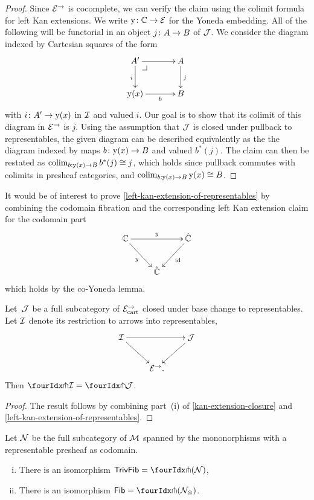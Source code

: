 \documentclass[reqno,10pt,a4paper,oneside,draft]{amsart}
\begin{document}
\begin{proof}
Since $\catE^\to$ is cocomplete, we can verify the claim using the colimit formula for left Kan extensions.
We write $\yon \co \cat{C} \to \catE$ for the Yoneda embedding.
All of the following will be functorial in an object $j \co A \to B$ of $\cal{J}$.
We consider the diagram indexed by Cartesian squares of the form
\[
\xymatrix@C=1.2cm{
  A'
  \ar[r]
  \ar[d]_{i}
  \pullback{dr}
&
  A
  \ar[d]^{j}
\\
  \yon(x)
  \ar[r]_-b
&
  B
}
\]
with $i \co A' \to \yon(x)$ in $\cal{I}$ and valued $i$.
Our goal is to show that its colimit of this diagram in $\catE^\to$ is $j$.
Using the assumption that $\cal{J}$ is closed under pullback to representables, the given diagram can be described equivalently as the the diagram indexed by maps $b \co \yon(x) \to B$ and valued $b^*(j)$.
The claim can then be restated as $\colim_{b : \yon(x) \to B} b^*(j) \iso j$, which holds since pullback commutes with colimits in presheaf categories, and $\colim_{b : \yon(x) \to B} \yon(x) \iso B$.
\end{proof}

\begin{remark}
It would be of interest to prove \cref{left-kan-extension-of-representables} by combining the codomain fibration and the corresponding left Kan extension claim for the codomain part
\[
\xymatrix{
  \cat{C}
  \ar[rr]^{y}
  \ar[dr]_{y}
&&
  \hat{\catC}
  \ar[dl]^{\id}
\\&
  \hat{\cat{C}}
}
\]
which holds by the co-Yoneda lemma.
\end{remark}

\begin{proposition} \label{awfs-on-arrows-into-representables}
Let~$\cal{J}$ be a full subcategory of $\catE_{\cart}^\to$ closed under base change to representables.
Let $\cal{I}$ denote its restriction to arrows into representables,
\[
\xymatrix{
  \cal{I}
  \ar[rr]
  \ar[dr]
&&
  \cal{J}
  \ar[dl]
\\&
  \catE^\to \rlap{.}
}
\]
Then $\liftr{\cal{I}} = \liftr{\cal{J}}$.
\end{proposition}

\begin{proof}
The result follows by combining part~(i) of \cref{kan-extension-closure} and \cref{left-kan-extension-of-representables}.
\end{proof}



\begin{theorem} \label{small-gen-triv-kan} Let $\cal{N}$ be the full subcategory of $\cal{M}$ spanned by the mononorphisms with a representable presheaf as codomain.
\begin{enumerate}[(i)]
\item There is an isomorphism
$\mathsf{TrivFib} = \liftr{ ( \cal{N}) }$,
\item There is an isomorphism $\mathsf{Fib} = \liftr{(\cal{N}_\otimes)}$.
\end{enumerate}
\end{theorem}
\end{document}
